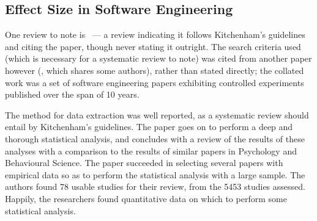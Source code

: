 \subsection{Effect Size in Software Engineering}
One review to note is~\citet*{Kampenes2007} --- a review indicating it follows Kitchenham's guidelines and citing the paper, though never stating it outright. The search criteria used (which is necessary for a systematic review to note) was cited from another paper however (\cite{Sjoberg2005}, which shares some authors), rather than stated directly; the collated work was a set of software engineering papers exhibiting controlled experiments published over the span of 10 years.\par

The method for data extraction was well reported, as a systematic review should entail by Kitchenham's guidelines. The paper goes on to perform a deep and thorough statistical analysis, and concludes with a review of the results of these analyses with a comparison to the results of similar papers in Psychology and Behavioural Science. The paper succeeded in selecting several papers with empirical data so as to perform the statistical analysis with a large sample. The authors found 78 usable studies for their review, from the 5453 studies assessed. Happily, the researchers found quantitative data on which to perform some statistical analysis.\par

